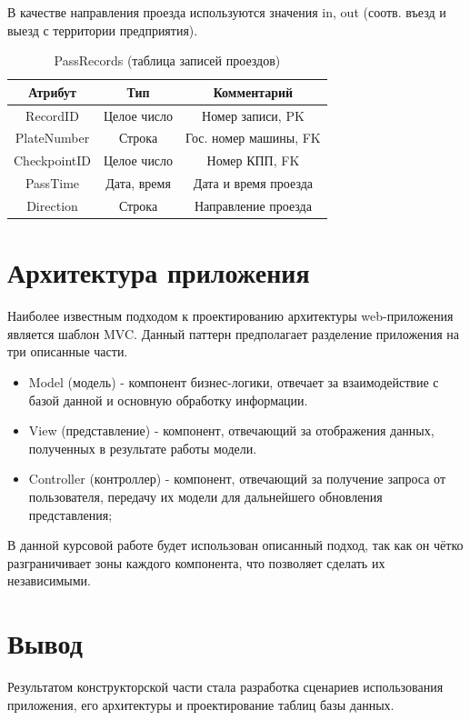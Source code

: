 В качестве направления проезда используются значения in, out (соотв. въезд и выезд с территории предприятия).
\newpage
\begin{table}[h!] \label{pass_table}
	\begin{center}
		\caption{PassRecords (таблица записей проездов)}
		\begin{tabular}{| c | c | c |}
			\hline
			\textbf{Атрибут}		&	\textbf{Тип}		& \textbf{Комментарий} \\
			\hline
			RecordID	&	Целое число	&	Номер записи, PK \\ \hline
			PlateNumber	&	Строка		&	Гос. номер машины, FK \\ \hline
			CheckpointID &	Целое число	&	Номер КПП, FK \\ \hline
			PassTime 	&	Дата, время	&	Дата и время проезда \\ \hline
			Direction 	&	Строка		&	Направление проезда \\ \hline
		\end{tabular}
	\end{center}
\end{table}

\section{Архитектура приложения}
Наиболее известным подходом к проектированию архитектуры web-приложения является шаблон MVC. Данный паттерн предполагает разделение приложения на три описанные части.
\begin{itemize}
	\item Model (модель) - компонент бизнес-логики, отвечает за взаимодействие с базой данной и основную обработку информации.
	\item View (представление) - компонент, отвечающий за отображения данных, полученных в результате работы модели.
	\item Controller (контроллер) - компонент, отвечающий за получение запроса от пользователя, передачу их модели для дальнейшего обновления представления;
\end{itemize}

В данной курсовой работе будет использован описанный подход, так как он чётко разграничивает зоны каждого компонента, что позволяет сделать их независимыми.


\section*{Вывод}
Результатом конструкторской части стала разработка сценариев использования приложения, его архитектуры и проектирование таблиц базы данных.



